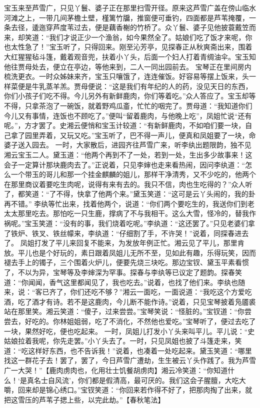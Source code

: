\documentclass[12pt,oneside]{book}
\begin{document}
宝玉来至芦雪广，只见丫鬟、婆子正在那里扫雪开径。原来这芦雪广盖在傍山临水河滩之上，一带几间茅檐土壁，槿篱竹牖，推窗便可垂钓，四面都是芦苇掩覆，一条去径，逶迤穿芦度苇过去，便是藕香榭的竹桥了。众丫鬟、婆子见他披蓑戴笠而来，却笑道：“我们才说正少一个渔翁，如今果然全了。姑娘们吃了饭才来呢，你也太性急了！”宝玉听了，只得回来。刚至沁芳亭，见探春正从秋爽斋出来，围着大红猩猩毡斗篷，戴着观音兜，扶着小丫头，后面一个妇人打着青绸油伞。宝玉知他往贾母处去，便立在亭边，等他来到，二人一同出园前去。
宝琴正在里间房内梳洗更衣。一时众姊妹来齐，宝玉只嚷饿了，连连催饭。好容易等摆上饭来，头一样菜便是牛乳蒸羊羔。贾母便说：“这是我们有年纪的人的药，没见天日的东西，你们小孩子们吃不得。今儿另外有新鲜鹿肉，你们等着吃。”众人答应了。宝玉却等不得，只拿茶泡了一碗饭，就着野鸡瓜齑，忙忙的咽完了。贾母道：“我知道你们今儿又有事情，连饭也不顾吃了。”便叫“留着鹿肉，与他晚上吃”，凤姐忙说“还有呢。”，方才罢了。史湘云便悄和宝玉计较道：“有新鲜鹿肉，不如咱们要一块，自己拿了园里弄着，又玩又吃。”宝玉听了，巴不得一声儿，便真和凤姐要了一块，命婆子送入园去。
一时，大家散后，进园齐往芦雪广来，听李纨出题限韵，独不见湘云宝玉二人。黛玉道：“他两个再到不了一处，若到一处，生出多少故事来！这会子一定算计那块鹿肉去了。”正说着，只见李婶也走来看热闹，因问李纨道：“怎么一个带玉的哥儿和那一个挂金麒麟的姐儿，那样干净清秀，又不少吃的，他两个在那里商议着要吃生肉呢，说得有来有去的。我只不信，肉也生吃得的？”众人听了，都笑道：“了不得，快拿了他两个来。”黛玉笑道：“这可是云丫头闹的，我的卦再不错。”
李纨等忙出来，找着他两个，说道：“你们两个要吃生的，我送你们到老太太那里吃去。那怕吃一只生鹿，撑病了不与我相干。这么大雪，怪冷的，替我作祸呢。”宝玉笑道：“没有的事，我们烧着吃呢。”李纨道：“这还罢了。”只见老婆们拿了铁炉、铁叉、铁丝幪来，李纨道：“仔细割了手，不许哭！”说着，同探春进去了。
凤姐打发了平儿来回复不能来，为发放年例正忙。湘云见了平儿，那里肯放。平儿也是个好玩的，素日跟着凤姐儿无所不至，见如此有趣，乐得玩笑，因而褪去手上的镯子，三个围着火炉儿，便要先烧三块吃。那边宝钗、黛玉平素看惯了，不以为异，宝琴等及李婶深为罕事。探春与李纨等已议定了题韵。探春笑道：“你闻闻，香气这里都闻见了，我也吃去。”说着，也找了他们来。李纨也随来，说：“客已齐了，你们还吃不够？”湘云一面吃，一面说道：“我吃这个方爱吃酒，吃了酒才有诗。若不是这鹿肉，今儿断不能作诗。”说着，只见宝琴披着凫靥裘站在那里笑。湘云笑道：“傻子，过来尝尝。”宝琴笑说：“怪脏的。”宝钗道：“你尝尝去，好吃的。你林姐姐弱，吃了不消化，不然他也爱吃。”宝琴听了，便过去吃了一块，果然好吃，便也吃起来。
一时，凤姐儿打发小丫头来叫平儿。平儿说：“史姑娘拉着我呢，你先走罢。”小丫头去了。一时，只见凤姐也披了斗篷走来，笑道：“吃这样好东西，也不告诉我！”说着，也凑着一处吃起来。黛玉笑道：“哪里找这一群花子去！罢了，罢了，今日芦雪广遭劫，生生被云丫头作践了。我为芦雪广一大哭！”【鹿肉虏肉也，化用壮士饥餐胡虏肉】湘云冷笑道：“你知道什么！‘是真名士自风流’，你们都是假清高，最可厌的。我们这会子腥膻，大吃大嚼，回来却是锦心绣口。”宝钗笑道：“你回来若作得不好了，把那肉掏了出来，就把这雪压的芦苇子揌上些，以完此劫。”【春秋笔法】
\end{document}
